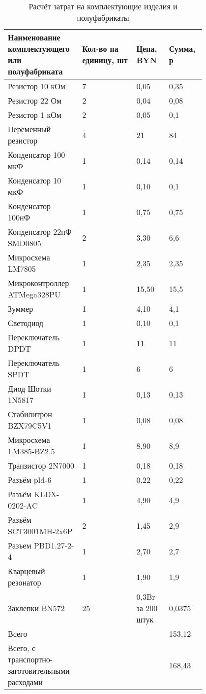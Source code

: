 \begin{table}[H]
  \caption{Расчёт затрат на комплектующие изделия и полуфабрикаты}
  \small
  \begin{tabular}{| p{0.25\linewidth} |  p{0.25\linewidth} |  p{0.15\linewidth} |  p{0.15\linewidth} |}
    \hline
Наименование комплектующего или полуфабриката & Кол-во на единицу, шт & Цена, BYN & Сумма, р\\[0pt]
\hline
  Резистор 10 кОм & 7 & 0,05 & 0,35 \\[0pt]
  \hline
  Резистор 22 Ом  & 2 & 0,04 & 0,08 \\[0pt]
  \hline
  Резистор 1 кОм  & 2 & 0,05 & 0,1\\[0pt]
  \hline
  Переменный резистор & 4 & 21 & 84\\[0pt]
  \hline
  Конденсатор 100 мкФ & 1 & 0,14 & 0,14\\[0pt]
  \hline
  Конденсатор 10 мкФ  & 1 & 0,10 & 0,1\\[0pt]
  \hline
  Конденсатор 100нФ & 1 & 0,75 & 0,75 \\[0pt]
  \hline
  Конденсатор 22пФ SMD0805 & 2 & 3,30 & 6,6\\[0pt]
  \hline
  Микросхема LM7805 & 1 & 2,35 & 2,35 \\[0pt]
  \hline
  Микроконтроллер ATMega328PU & 1 & 15,50 & 15,5 \\[0pt]
  \hline
  Зуммер & 1 & 4,10 & 4,1 \\[0pt]
  \hline
  Светодиод & 1 & 0,10 & 0,1 \\[0pt]
  \hline
  Переключатель DPDT & 1 & 11 & 11 \\[0pt]
  \hline
  Переключатель SPDT & 1 & 6 & 6\\[0pt]
  \hline
  Диод Шотки 1N5817 & 1 & 0,13 & 0,13 \\[0pt]
  \hline
  Стабилитрон BZX79C5V1 & 1 & 0,08 & 0,08 \\[0pt]
  \hline
  Микросхема LM385-BZ2.5 & 1 & 8,90 & 8,9\\[0pt]
  \hline
  Транзистор 2N7000 & 1 & 0,18 & 0,18 \\[0pt]
  \hline
  Разъём pld-6 & 1 & 0,22 & 0,22 \\[0pt]
  \hline
  Разъём KLDX-0202-AC & 1 & 4,90 & 4,9 \\[0pt]
  \hline
  Разъём SCT3001MH-2x6P & 2 & 1,45 & 2,9 \\[0pt]
  \hline
  Разъем PBD1.27-2-4 & 1 & 2,70 & 2,7 \\[0pt]
  \hline
  Кварцевый резонатор & 1 & 1,90 & 1,9\\[0pt]
  \hline
  Заклепки BN572 & 25 & 0,3Br за 200 штук & 0,0375\\[0pt]
  \hline
  Всего &  &  & 153,12\\[0pt]
  \hline
  Всего, с транспортно-заготовительными расходами &  &  & 168,43\\[0pt]
  \hline
\end{tabular}
\end{table}

